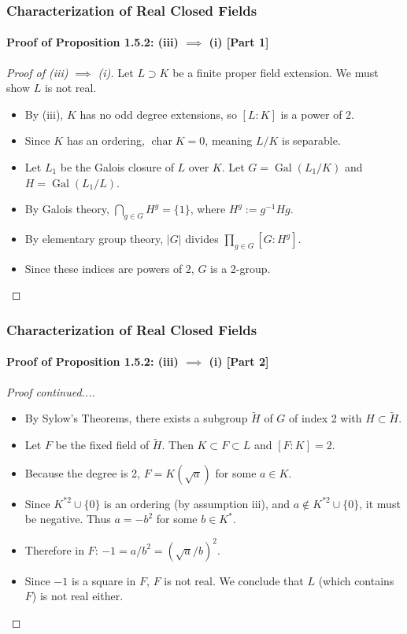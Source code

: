 \documentclass[11pt]{beamer}
\begin{document}
\begin{frame}
    \frametitle{Characterization of Real Closed Fields}
    \framesubtitle{Proof of Proposition 1.5.2: (iii) $\implies$ (i) [Part 1]}

    \begin{proof}[Proof of (iii) $\implies$ (i)]
        Let $L \supset K$ be a finite proper field extension. We must show $L$ is not real.
        \begin{itemize}
            \item By (iii), $K$ has no odd degree extensions, so $[L : K]$ is a power of 2.
            \item Since $K$ has an ordering, $\operatorname{char} K = 0$, meaning $L/K$ is separable.
            \item Let $L_1$ be the Galois closure of $L$ over $K$. Let $G = \operatorname{Gal}(L_1/K)$ and $H = \operatorname{Gal}(L_1/L)$.
            \item By Galois theory, $\bigcap_{g \in G} H^g = \{1\}$, where $H^g := g^{-1}Hg$.
            \item By elementary group theory, $|G|$ divides $\prod_{g \in G} [G : H^g]$. 
            \item Since these indices are powers of 2, $G$ is a 2-group.
        \end{itemize}
    \end{proof}
\end{frame}

\begin{frame}
    \frametitle{Characterization of Real Closed Fields}
    \framesubtitle{Proof of Proposition 1.5.2: (iii) $\implies$ (i) [Part 2]}

    \begin{proof}[Proof continued...]
        \begin{itemize}
            \item By Sylow's Theorems, there exists a subgroup $\tilde{H}$ of $G$ of index 2 with $H \subset \tilde{H}$. 
            \item Let $F$ be the fixed field of $\tilde{H}$. Then $K \subset F \subset L$ and $[F : K] = 2$.
            \item Because the degree is 2, $F = K(\sqrt{a})$ for some $a \in K$.
            \item Since $K^{*2} \cup \{0\}$ is an ordering (by assumption iii), and $a \notin K^{*2} \cup \{0\}$, it must be negative. Thus $a = -b^2$ for some $b \in K^*$.
            \item Therefore in $F$: $-1 = a/b^2 = (\sqrt{a}/b)^2$.
            \item Since $-1$ is a square in $F$, $F$ is not real. We conclude that $L$ (which contains $F$) is not real either. \qedhere
        \end{itemize}
    \end{proof}
\end{frame}
\end{document}
